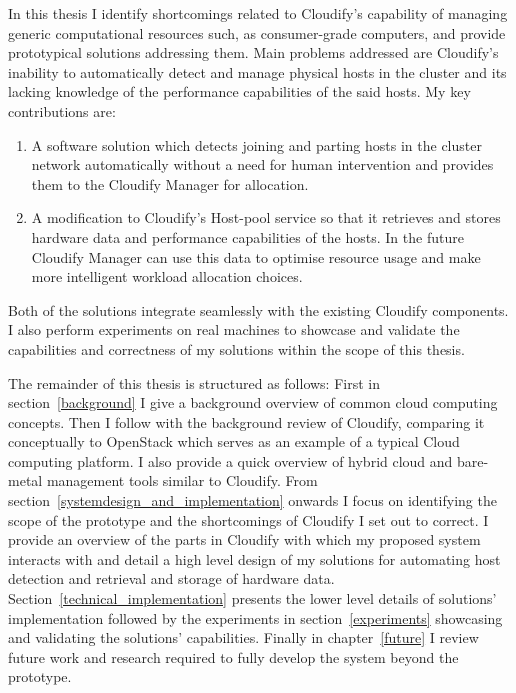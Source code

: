 In this thesis I identify shortcomings related to Cloudify's capability of managing generic computational resources such, as consumer-grade computers, and provide prototypical solutions addressing them. Main problems addressed are Cloudify's inability to automatically detect and manage physical hosts in the cluster and its lacking knowledge of the performance capabilities of the said hosts. My key contributions are:

\begin{enumerate}
\item  A software solution which detects joining and parting hosts in the cluster network automatically without a need for human intervention and provides them to the Cloudify Manager for allocation.
\item A modification to Cloudify's Host-pool service so that it retrieves and stores hardware data and performance capabilities of the hosts. In the future Cloudify Manager can use this data to optimise resource usage and make more intelligent workload allocation choices.
\end{enumerate}

Both of the solutions integrate seamlessly with the existing Cloudify components. I also perform experiments on real machines to showcase and validate the capabilities and correctness of my solutions within the scope of this thesis.

The remainder of this thesis is structured as follows: First in section~\ref{background} I give a background overview of common cloud computing concepts. Then I follow with the background review of Cloudify, comparing it conceptually to OpenStack which serves as an example of a typical Cloud computing platform. I also provide a quick overview of hybrid cloud and bare-metal management tools similar to Cloudify.
From section~\ref{systemdesign_and_implementation} onwards I focus on identifying the scope of the prototype and the shortcomings of Cloudify I set out to correct. I provide an overview of the parts in Cloudify with which my proposed system interacts with and detail a high level design of my solutions for automating host detection and retrieval and storage of hardware data. Section~\ref{technical_implementation} presents the lower level details of solutions' implementation followed by the experiments in section~\ref{experiments} showcasing and validating the solutions' capabilities. Finally in chapter~\ref{future} I review future work and research required to fully develop the system beyond the prototype.

\pagebreak